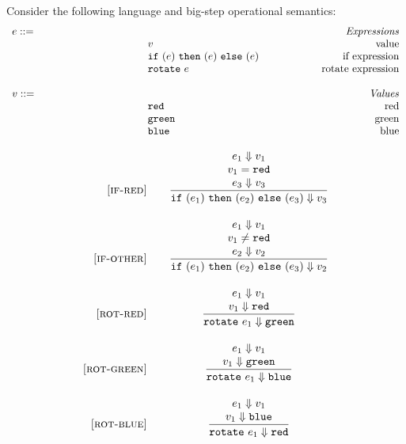 \documentclass[addpoints]{exam}
\begin{document}
\begin{questions}
Consider the following language and big-step operational semantics:
\[
  \begin{array}{ll@{\qquad\qquad\qquad}r}
  \mydefhead{e ::=}{Expressions}
  \mydefcase{v}{value}
  \mydefcase{\ife e e e}{if expression}
  \mydefcase{\rot e}{rotate expression}
  \\
  \mydefhead{v ::=\qquad\qquad\qquad\qquad}{Values}
  \mydefcase{\rval}{red}
  \mydefcase{\gval}{green}
  \mydefcase{\bval}{blue}
\end{array}
\]

\[
  \begin{array}{r@{\qquad}c}

    \ssrule{if-red}{
      \bstep{e_1}{v_1} \\
      v_1 = \rval \\
      \bstep{e_3}{v_3}
    }{
      \bstep{\ife{e_1}{e_2}{e_3}}{v_3}
    }

    \ssrule{if-other}{
      \bstep{e_1}{v_1} \\
      v_1 \neq \rval \\
      \bstep{e_2}{v_2}
    }{
      \bstep{\ife{e_1}{e_2}{e_3}}{v_2}
    }



    \ssrule{rot-red}{
     \bstep{e_1}{v_1} \\
      \bstep{v_1}{\rval}
    }{
      \bstep{\rot e_1}{\gval}
    }

    \ssrule{rot-green}{
      \bstep{e_1}{v_1} \\
      \bstep{v_1}{\gval}
    }{
      \bstep{\rot e_1}{\bval}
    }

    \ssrule{rot-blue}{
      \bstep{e_1}{v_1} \\
      \bstep{v_1}{\bval}
    }{
      \bstep{\rot e_1}{\rval}
    }
    
  \end{array}
\]

\end{questions}
\end{document}
